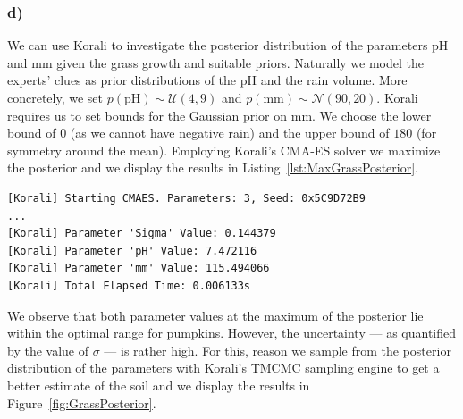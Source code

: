 \documentclass{article}
\begin{document}
    \subsubsection*{d)}
    \label{subsubsec:Task1d}

    We can use Korali to investigate the posterior distribution of the
    parameters pH and mm given the grass growth and suitable priors.
    Naturally we model the experts' clues as prior distributions of the pH and
    the rain volume.
    More concretely, we set $p(\text{pH}) \sim \mathcal{U}(4, 9)$ and
    $p(\text{mm}) \sim \mathcal{N}(90, 20)$.
    Korali requires us to set bounds for the Gaussian prior on mm.
    We choose the lower bound of $0$ (as we cannot have negative rain) and
    the upper bound of $180$ (for symmetry around the mean).
    Employing Korali's CMA-ES solver we maximize the posterior and we display
    the results in Listing~\ref{lst:MaxGrassPosterior}.

    \begin{lstlisting}[basicstyle=\tiny, frame=single, caption={Korali
    output when maximizing the posterior of the pH and mm parameters.},
    label={lst:MaxGrassPosterior}]
[Korali] Starting CMAES. Parameters: 3, Seed: 0x5C9D72B9
...
[Korali] Parameter 'Sigma' Value: 0.144379
[Korali] Parameter 'pH' Value: 7.472116
[Korali] Parameter 'mm' Value: 115.494066
[Korali] Total Elapsed Time: 0.006133s
    \end{lstlisting}

    We observe that both parameter values at the maximum of the posterior lie
    within the optimal range for pumpkins.
    However, the uncertainty --- as quantified by the value of $\sigma$ --- is
    rather high.
    For this, reason we sample from the posterior distribution of the
    parameters with Korali's TMCMC sampling engine to get a better estimate
    of the soil and we display the results in Figure~\ref{fig:GrassPosterior}.
\end{document}
